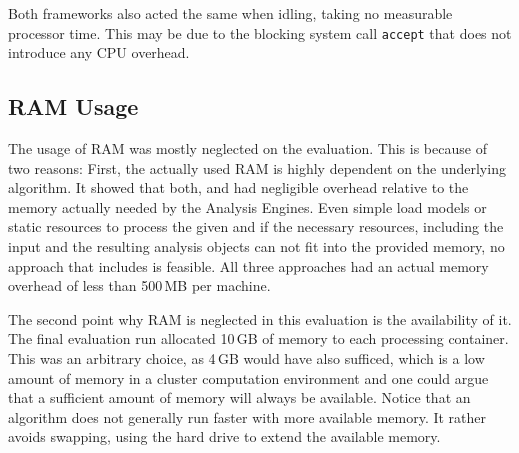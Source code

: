 Both frameworks also acted the same when idling, taking no measurable processor time. This may be due to the blocking system call \lstinline|accept| that does not introduce any CPU overhead.
\subsection{RAM Usage}
The usage of RAM was mostly neglected on the evaluation. This is because of two reasons: First, the actually used RAM is highly dependent on the underlying algorithm. It showed that both, \uimaas{} and \spark{} had negligible overhead relative to the memory actually needed by the Analysis Engines. Even simple \anens{} load models or static resources to process the given \cas{} and if the necessary resources, including the input \cas{} and the resulting analysis objects can not fit into the provided memory, no approach that includes \uima{} is feasible. All three approaches had an actual memory overhead of less than 500\,MB per machine.

The second point why RAM is neglected in this evaluation is the availability of it. The final evaluation run allocated 10\,GB of memory to each processing container. This was an arbitrary choice, as 4\,GB would have also sufficed, which is a low amount of memory in a cluster computation environment and one could argue that a sufficient amount of memory will always be available. Notice that an algorithm does not generally run faster with more available memory. It rather avoids swapping, using the hard drive to extend the available memory. 

